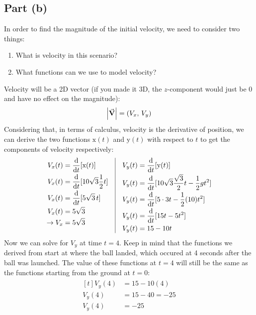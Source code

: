 \documentclass{article}
\newcommand{\x}{\mathrm{x}}
\newcommand{\y}{\mathrm{y}}
\newcommand{\ddt}[1]{\frac{\mathrm{d}}{\mathrm{d}t}[#1]}
\begin{document}
\subsection*{Part (b)}
In order to find the magnitude of the initial velocity, we need 
to consider two things:
\begin{enumerate}
    \item What is velocity in this scenario?
    \item What functions can we use to model velocity?
\end{enumerate}
Velocity will be a 2D vector (if you made it 3D, the $z$-component
would just be 0 and have no effect on the magnitude):
\[ \abs{\va{V}} = (V_x,\, V_y) \]
Considering that, in terms of calculus, velocity is the derivative
of position, we can derive the two functions $\x(t)$ and $\y(t)$
with respect to $t$ to get the components of velocity respectively:
\[
    \begin{array}{lcl}    
        \begin{aligned}[t]
            V_x(t) &= \ddt{\x(t)} \\
            V_x(t) &= \ddt{10\sqrt3\frac{1}{2}t} \\
            V_x(t) &= \ddt{5\sqrt3\,t} \\
            V_x(t) &= 5\sqrt3 \\
            \rightarrow V_x &= 5\sqrt3
        \end{aligned}
        \hspace{1em}\vline\hspace{1em}
        \begin{aligned}[t]
           V_y(t) &= \ddt{\y(t)} \\
           V_y(t) &= \ddt{10\sqrt3\frac{\sqrt3}{2}t-\frac{1}{2}gt^2} \\
           V_y(t) &= \ddt{5\cdot3t-\frac{1}{2}(10)t^2} \\
           V_y(t) &= \ddt{15t-5t^2} \\
           V_y(t) &= 15-10t
        \end{aligned}
    \end{array}
\] 
Now we can solve for $V_y$ at time $t=4$. Keep in mind that the functions 
we derived from start at where the ball landed, which occured at 4 seconds 
after the ball was launched. The value of these functions at $t=4$ will 
still be the same as the functions starting from the ground at $t=0$:
\[
    \begin{array}{lcl}    
        \begin{aligned}[t]
           V_y(4) &= 15-10(4) \\
           V_y(4) &= 15-40 = -25 \\
           V_y(4) &= -25
        \end{aligned}
    \end{array}
\] 
\end{document}
